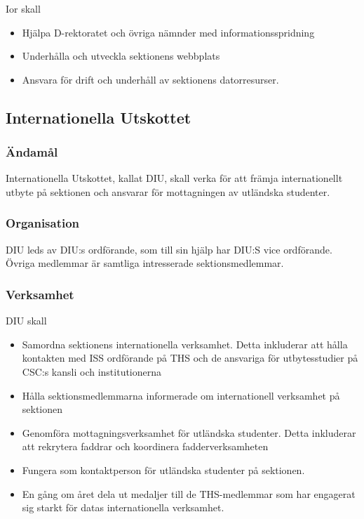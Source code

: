 \documentclass{dgovdoc}
\begin{document}
Ior skall

\begin{itemize}
  \item Hjälpa D-rektoratet och övriga nämnder med informationsspridning
  \item Underhålla och utveckla sektionens webbplats
  \item Ansvara för drift och underhåll av sektionens datorresurser.
\end{itemize}

\subsection{Internationella Utskottet}

\subsubsection{Ändamål}

Internationella Utskottet, kallat DIU, skall verka för att främja internationellt utbyte på sektionen och ansvarar för mottagningen av utländska studenter.

\subsubsection{Organisation}

DIU leds av DIU:s ordförande, som till sin hjälp har DIU:S vice ordförande. Övriga medlemmar är samtliga intresserade sektionsmedlemmar.

\subsubsection{Verksamhet}

DIU skall

\begin{itemize}
  \item Samordna sektionens internationella verksamhet. Detta inkluderar att hålla kontakten med ISS ordförande på THS och de ansvariga för utbytesstudier på CSC:s kansli och institutionerna
  \item Hålla sektionsmedlemmarna informerade om internationell verksamhet på sektionen
  \item Genomföra mottagningsverksamhet för utländska studenter. Detta inkluderar att rekrytera faddrar och koordinera fadderverksamheten
  \item Fungera som kontaktperson för utländska studenter på sektionen.
  \item En gång om året dela ut medaljer till de THS-medlemmar som har engagerat sig starkt för datas internationella verksamhet.
\end{itemize}
\end{document}
